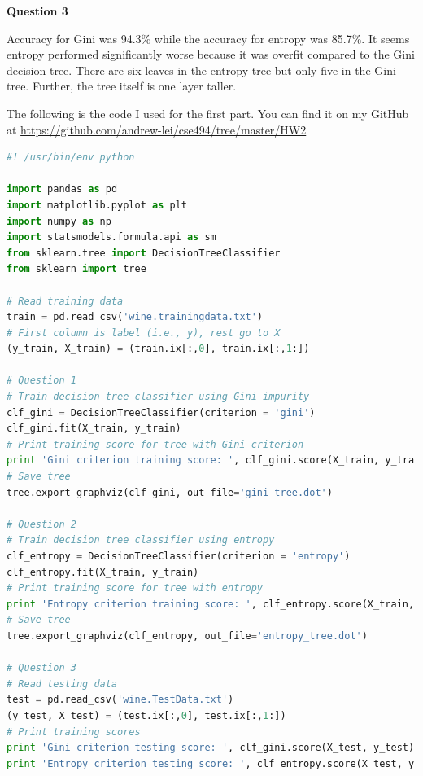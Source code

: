 \documentclass{article}
\begin{document}
	\noindent
	\textbf{Question 3}
	\par 
	Accuracy for Gini was 94.3\% while the accuracy for entropy was 85.7\%. It seems entropy performed significantly worse because it was overfit compared to the Gini decision tree. There are six leaves in the entropy tree but only five in the Gini tree. Further, the tree itself is one layer taller.
	\par 
	The following is the code I used for the first part. You can find it on my GitHub at \url{https://github.com/andrew-lei/cse494/tree/master/HW2}
	\newpage
	\begin{lstlisting}[language=python]
#! /usr/bin/env python

import pandas as pd
import matplotlib.pyplot as plt
import numpy as np
import statsmodels.formula.api as sm
from sklearn.tree import DecisionTreeClassifier
from sklearn import tree

# Read training data
train = pd.read_csv('wine.trainingdata.txt')
# First column is label (i.e., y), rest go to X
(y_train, X_train) = (train.ix[:,0], train.ix[:,1:])

# Question 1
# Train decision tree classifier using Gini impurity
clf_gini = DecisionTreeClassifier(criterion = 'gini')
clf_gini.fit(X_train, y_train)
# Print training score for tree with Gini criterion
print 'Gini criterion training score: ', clf_gini.score(X_train, y_train)
# Save tree
tree.export_graphviz(clf_gini, out_file='gini_tree.dot')

# Question 2
# Train decision tree classifier using entropy
clf_entropy = DecisionTreeClassifier(criterion = 'entropy')
clf_entropy.fit(X_train, y_train)
# Print training score for tree with entropy
print 'Entropy criterion training score: ', clf_entropy.score(X_train, y_train)
# Save tree
tree.export_graphviz(clf_entropy, out_file='entropy_tree.dot')

# Question 3
# Read testing data
test = pd.read_csv('wine.TestData.txt')
(y_test, X_test) = (test.ix[:,0], test.ix[:,1:])
# Print training scores
print 'Gini criterion testing score: ', clf_gini.score(X_test, y_test)
print 'Entropy criterion testing score: ', clf_entropy.score(X_test, y_test)
	\end{lstlisting}
	\newpage
	
\end{document}
